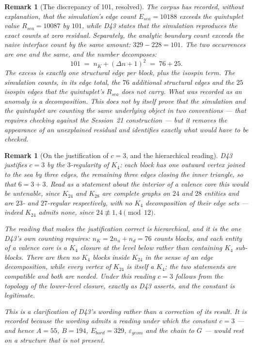 \documentclass[11pt,a4paper]{article}
\def\mathrm#1{#1}%
\newtheorem{remark}[theorem]{Remark}
\begin{document}
\begin{remark}[The discrepancy of 101, resolved]
\label{rem:101}
The corpus has recorded, without explanation, that the simulation's edge count $E_{\mathrm{sea}}=10188$ exceeds the quintuplet value $R_{\mathrm{sea}}=10087$ by $101$, while D43 states that the simulation reproduces the exact counts at zero residual. Separately, the analytic boundary count exceeds the naive interface count by the same amount: $329-228=101$. The two occurrences are one and the same, and the number decomposes:
\[
101 \;=\; n_K + (\Delta n+1)^2 \;=\; 76 + 25 .
\]
The excess is exactly one structural edge per block, plus the isospin term. The simulation counts, in its edge total, the $76$ additional structural edges and the $25$ isospin edges that the quintuplet's $R_{\mathrm{sea}}$ does not carry. What was recorded as an anomaly is a decomposition. This does not by itself prove that the simulation and the quintuplet are counting the same underlying object in two conventions --- that requires checking against the Session~21 construction --- but it removes the appearance of an unexplained residual and identifies exactly what would have to be checked.
\end{remark}

\begin{remark}[On the justification of $c=3$, and the hierarchical reading]
\label{rem:c3}
D43 justifies $c=3$ by the $3$-regularity of $K_4$: each block has one outward vertex joined to the sea by three edges, the remaining three edges closing the inner triangle, so that $6=3+3$. Read as a statement about the interior of a valence core this would be untenable, since $K_{24}$ and $K_{28}$ are complete graphs on $24$ and $28$ entities and are $23$- and $27$-regular respectively, with no $K_4$ decomposition of their edge sets --- indeed $K_{24}$ admits none, since $24\not\equiv1,4\pmod{12}$.

The reading that makes the justification correct is hierarchical, and it is the one D43's own counting requires: $n_K=2n_u+n_d=76$ counts \emph{blocks}, and each entity of a valence core \emph{is} a $K_4$ closure at the level below rather than containing $K_4$ sub-blocks. There are then no $K_4$ blocks inside $K_{24}$ in the sense of an edge decomposition, while every vertex of $K_{24}$ is itself a $K_4$; the two statements are compatible and both are needed. Under this reading $c=3$ follows from the topology of the lower-level closure, exactly as D43 asserts, and the constant is legitimate.

This is a clarification of D43's wording rather than a correction of its result. It is recorded because the wording admits a reading under which the constant $c=3$ --- and hence $A=55$, $B=194$, $E_{\mathrm{bord}}=329$, $\varepsilon_{\mathrm{geom}}$ and the chain to $G$ --- would rest on a structure that is not present.
\end{remark}
\end{document}
